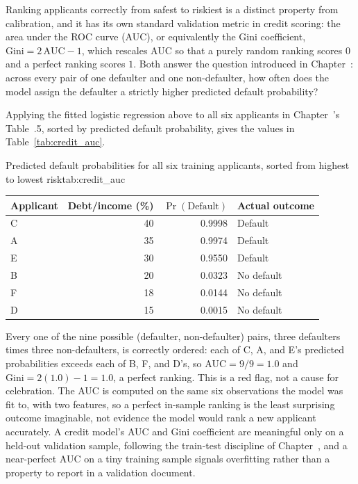 \documentclass[../ai_in_finance]{subfiles}
\begin{document}
Ranking applicants correctly from safest to riskiest is a distinct property from calibration, and it has its own standard validation metric in credit scoring: the area under the ROC curve (AUC), or equivalently the Gini coefficient, $\text{Gini} = 2\,\text{AUC}-1$, which rescales AUC so that a purely random ranking scores $0$ and a perfect ranking scores $1$. Both answer the question introduced in Chapter~: across every pair of one defaulter and one non-defaulter, how often does the model assign the defaulter a strictly higher predicted default probability?

Applying the fitted logistic regression above to all six applicants in Chapter~'s Table~.5, sorted by predicted default probability, gives the values in Table~\ref{tab:credit_auc}.

\begin{booktable}[htbp]{Predicted default probabilities for all six training applicants, sorted from highest to lowest risk}{tab:credit_auc}
\begin{tabular}{lrrl}
\toprule
Applicant & Debt/income (\%) & $\Pr(\text{Default})$ & Actual outcome \\
\midrule
C & 40 & 0.9998 & Default \\
A & 35 & 0.9974 & Default \\
E & 30 & 0.9550 & Default \\
B & 20 & 0.0323 & No default \\
F & 18 & 0.0144 & No default \\
D & 15 & 0.0015 & No default \\
\bottomrule
\end{tabular}
\end{booktable}

Every one of the nine possible (defaulter, non-defaulter) pairs, three defaulters times three non-defaulters, is correctly ordered: each of C, A, and E's predicted probabilities exceeds each of B, F, and D's, so $\text{AUC}=9/9=1.0$ and $\text{Gini}=2(1.0)-1=1.0$, a perfect ranking. This is a red flag, not a cause for celebration. The AUC is computed on the same six observations the model was fit to, with two features, so a perfect in-sample ranking is the least surprising outcome imaginable, not evidence the model would rank a new applicant accurately.
A credit model's AUC and Gini coefficient are meaningful only on a held-out validation sample, following the train-test discipline of Chapter~, and a near-perfect AUC on a tiny training sample signals overfitting rather than a property to report in a validation document.
\end{document}

